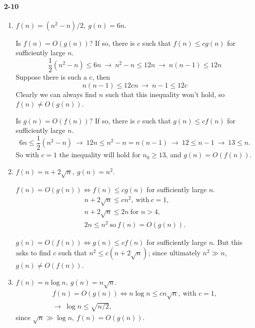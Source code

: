 \documentclass{report}
\begin{document}
\paragraph{2-10}
\begin{enumerate}[label=(\alph*)]
	\item $f(n) = (n^2 - n)/2,\ g(n) = 6n.$

		Is $f(n) = O(g(n))$? If so, there is $c$ such that $f(n) \le cg(n)$ for sufficiently large $n$.
		\begin{equation*}
			\frac{1}{2}\left(n^2 - n\right) \le 6n
				\ \rightarrow\ n^2 - n \le 12n
				\ \rightarrow\ n(n-1) \le 12n
		\end{equation*}
		Suppose there is such a $c$, then
		\begin{equation*}
			n(n-1) \le 12cn\ \rightarrow\ n-1 \le 12c
		\end{equation*}
		Clearly we can always find $n$ such that this inequality won't hold, so $f(n) \ne O(g(n))$.

		Is $g(n) = O(f(n))$? If so, there is $c$ such that $g(n) \le cf(n)$ for sufficiently large $n$.
		\begin{equation*}
			6n \le \frac{1}{2}\left(n^2 - n\right)
			\ \rightarrow\ 12n \le n^2 - n = n(n-1)
			\ \rightarrow\ 12 \le n - 1
			\ \rightarrow\ 13 \le n.
		\end{equation*}
		So with $c = 1$ the inequality will hold for $n_0 \ge 13$, and $g(n) = O(f(n))$.

	\item $f(n) = n + 2\sqrt{n},\ g(n) = n^2.$

		$f(n) = O(g(n)) \Leftrightarrow f(n) \le cg(n)$ for sufficiently large $n$.
		\begin{gather*}
			n + 2\sqrt{n} \le cn^2,\ \text{with}\ c = 1, \\
			n + 2\sqrt{n} \le 2n\ \text{for $n > 4$}, \\
			2n \le n^2\ \text{so}\ f(n) = O(g(n)).
		\end{gather*}

		$g(n) = O(f(n)) \Leftrightarrow g(n) \le cf(n)$ for sufficiently large $n$. But this asks to find $c$ such that $n^2 \le c\left(n + 2\sqrt{n}\right)$; since ultimately $n^2 \gg n$, $g(n) \ne O(f(n))$.

	\item $f(n) = n\log n,\ g(n) = n\sqrt{n}.$
		\begin{gather*}
			f(n) = O(g(n)) \Leftrightarrow n\log n \le cn\sqrt{n},\ \text{with $c=1,$} \\
			\rightarrow\ \log n \le \sqrt{n/2},
		\end{gather*}
		since $\sqrt{n} \gg \log n,\ f(n) = O(g(n)).$


\end{enumerate}
\end{document}
